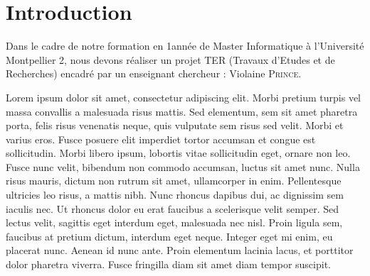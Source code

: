 \section*{Introduction}

Dans le cadre de notre formation en 1\iere année de Master Informatique à l'Université Montpellier 2, nous devons réaliser un projet TER (Travaux d'Etudes et de Recherches) encadré par un enseignant chercheur : Violaine \textsc{Prince}.

Lorem ipsum dolor sit amet, consectetur adipiscing elit. Morbi pretium turpis vel massa convallis a malesuada risus mattis. Sed elementum, sem sit amet pharetra porta, felis risus venenatis neque, quis vulputate sem risus sed velit. Morbi et varius eros. Fusce posuere elit imperdiet tortor accumsan et congue est sollicitudin. Morbi libero ipsum, lobortis vitae sollicitudin eget, ornare non leo. Fusce nunc velit, bibendum non commodo accumsan, luctus sit amet nunc. Nulla risus mauris, dictum non rutrum sit amet, ullamcorper in enim. Pellentesque ultricies leo risus, a mattis nibh. Nunc rhoncus dapibus dui, ac dignissim sem iaculis nec. Ut rhoncus dolor eu erat faucibus a scelerisque velit semper. Sed lectus velit, sagittis eget interdum eget, malesuada nec nisl. Proin ligula sem, faucibus at pretium dictum, interdum eget neque. Integer eget mi enim, eu placerat nunc. Aenean id nunc ante. Proin elementum lacinia lacus, et porttitor dolor pharetra viverra. Fusce fringilla diam sit amet diam tempor suscipit. 
